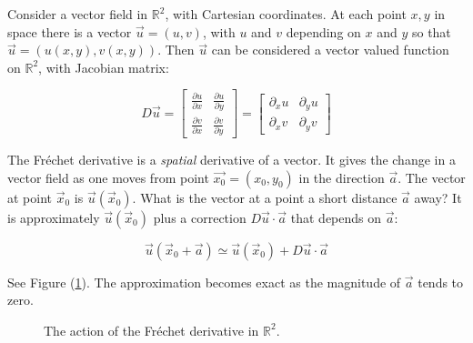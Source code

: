 \documentclass[12pt, a4paper, twoside, openright]{book}
\begin{document}
Consider a vector field in $\mathbb{R}^2$, with Cartesian coordinates.  At each point $x,y$ in space there is a vector $\vec{u} = (u,v)$, with $u$ and $v$ depending on $x$ and $y$ so that $\vec{u} = (u(x,y),v(x,y))$.  Then $\vec{u}$ can be considered a vector valued function on $\mathbb{R}^2$, with Jacobian matrix:

\begin{equation}
D \vec{u} = 
\begin{bmatrix}
\frac{\partial u}{\partial x} & \frac{\partial u}{\partial y} \\
\frac{\partial v}{\partial x} & \frac{\partial v}{\partial y}
\end{bmatrix}
=
\begin{bmatrix}
\partial_x u & \partial_y u \\
\partial_x v & \partial_y v
\end{bmatrix}
\end{equation}


The Fr\'{e}chet derivative is a \emph{spatial} derivative of a vector.  It gives the change in a vector field as one moves from point $\vec{x_0} = (x_0,y_0)$ in the direction $\vec{a}$.
The vector at point $\vec{x}_0$ is $\vec{u}(\vec{x}_0)$.  What is the vector at a point a short distance $\vec{a}$ away?  It is approximately $\vec{u}(\vec{x}_0)$ plus a correction $ D \vec{u} \cdot \vec{a}$ that depends on $\vec{a}$:

\begin{equation}
\vec{u}(\vec{x}_0 + \vec{a}) \simeq \vec{u}(\vec{x}_0) + D \vec{u} \cdot \vec{a}
\end{equation}

See Figure (\ref{frechet}). The approximation becomes exact as the magnitude of $\vec{a}$ tends to zero.

\begin{figure}[ht]
\centering
{}
\caption{The action of the Fr\'{e}chet derivative in $\mathbb{R}^2$.}\label{frechet}
\end{figure}
\end{document}
